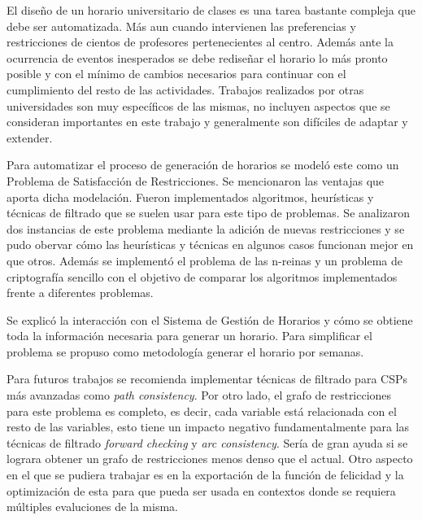\begin{conclusions}

El diseño de un horario universitario de clases es una tarea bastante compleja que debe ser automatizada. M\'as aun cuando intervienen las preferencias y restricciones de cientos de profesores pertenecientes al centro. Adem\'as ante la ocurrencia de eventos inesperados se debe rediseñar el horario lo m\'as pronto posible y con el m\'inimo de cambios necesarios para continuar con el cumplimiento del resto de las actividades. Trabajos realizados por otras universidades son muy espec\'ificos de las mismas, no incluyen aspectos que se consideran importantes en este trabajo y generalmente son dif\'iciles de adaptar y extender.

Para automatizar el proceso de generaci\'on de horarios se model\'o este como un Problema de Satisfacci\'on de Restricciones. Se mencionaron las ventajas que aporta dicha modelaci\'on. Fueron implementados algoritmos, heur\'isticas y t\'ecnicas de filtrado que se suelen usar para este tipo de problemas. Se analizaron dos instancias de este problema mediante la adici\'on de nuevas restricciones y se pudo obervar c\'omo las heur\'isticas y t\'ecnicas en algunos casos funcionan mejor en que otros. Adem\'as se implement\'o el problema de las n-reinas y un problema de criptograf\'ia sencillo con el objetivo de comparar los algoritmos implementados frente a diferentes problemas.

Se explic\'o la interacci\'on con el Sistema de Gesti\'on de Horarios y c\'omo se obtiene toda la informaci\'on necesaria para generar un horario. Para simplificar el problema se propuso como metodolog\'ia generar el horario por semanas.

Para futuros trabajos se recomienda implementar t\'ecnicas de filtrado para CSPs m\'as avanzadas como \emph{path consistency}. Por otro lado, el grafo de restricciones para este problema es completo, es decir, cada variable est\'a relacionada con el resto de las variables, esto tiene un impacto negativo fundamentalmente para las t\'ecnicas de filtrado \emph{forward checking} y \emph{arc consistency}. Ser\'ia de gran ayuda si se lograra obtener un grafo de restricciones menos denso que el actual. Otro aspecto en el que se pudiera trabajar es en la exportaci\'on de la funci\'on de felicidad y la optimizaci\'on de esta para que pueda ser usada en contextos donde se requiera m\'ultiples evaluciones de la misma.

\end{conclusions}
